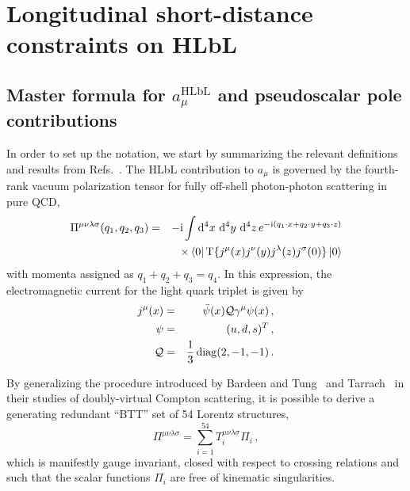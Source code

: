 \section{Longitudinal short-distance constraints on HLbL}
\label{Sec:SDC}
\subsection{Master formula for \texorpdfstring{$a_\mu^\text{HLbL}$}{a mu HLbL} and pseudoscalar pole contributions}
\label{Sec:SDCBTT}
In order to set up the notation, we start by summarizing the relevant definitions and results from Refs.~\cite{BTT2,BTT3}. The HLbL contribution to $a_\mu$ is governed by the fourth-rank vacuum polarization tensor for fully off-shell photon-photon scattering in pure QCD, 
\begin{eqnarray}
\Pi^{\mu\nu\lambda\sigma}(q_1,q_2,q_3) & = & -\text{i} \int \mathop{}\!\mathrm{d}^4 x\, \mathop{}\!\mathrm{d}^4 y \,\mathop{}\!\mathrm{d}^4 z \, e^{-\text{i}(q_1\cdot x + q_2 \cdot y + q_3 \cdot z)} \nonumber \\
&&\times \bra{0}\operatorname{T}\{j^\mu (x) j^\nu (y) j^\lambda (z) j^\sigma (0) \} \ket{0}
\label{Eq:HLbLTensor}
\end{eqnarray}
with  momenta assigned as $q_1+q_2+q_3 = q_4$. In this expression, the electromagnetic current for the light quark triplet is given by
\begin{eqnarray}
j^\mu (x) & = & \bar{\psi}(x) {\mathcal{Q}} \gamma^\mu \psi(x)\,, \nonumber \\
\psi & = & (u,d,s)^T\,, \nonumber \\
\mathcal{Q} & = & \frac{1}{3}\operatorname{diag}(2,-1,-1)\, .
\label{Eq:EM}
\end{eqnarray}

By generalizing the procedure introduced by Bardeen and Tung~\cite{BardeenTung} and Tarrach~\cite{Tarrach} in their studies of doubly-virtual Compton scattering, it is possible to derive a generating redundant \enquote{BTT} set of \num{54} Lorentz structures,
\begin{equation}
\Pi^{\mu\nu\lambda\sigma} = \sum_{i=1}^{54} T_i^{\mu\nu\lambda\sigma} \Pi_i\,,
\label{Eq:BTT}
\end{equation}
which is manifestly gauge invariant, closed with respect to crossing relations and such that the scalar functions $\Pi_i$ are free of kinematic singularities.

